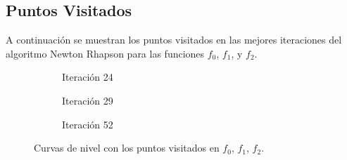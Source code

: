 \newpage
\subsection{Puntos Visitados}

A continuación se muestran los puntos visitados en las mejores iteraciones del algoritmo Newton Rhapson para las funciones $f_0$, $f_1$, y $f_2$. \\

\begin{figure}[h]
     \centering
     \begin{subfigure}[b]{0.45\textwidth}
         \centering
         
         \caption{Iteración 24}
         \label{fig:curvas-newton-f0}
     \end{subfigure}
     \hfill
     \begin{subfigure}[b]{0.45\textwidth}
         \centering
         
         \caption{Iteración 29}
         \label{fig:curvas-newton-f1}
     \end{subfigure}
     \hfill
     \begin{subfigure}[b]{0.45\textwidth}
         \centering
         
         \caption{Iteración 52}
         \label{fig:curvas-newton-f2-52}
     \end{subfigure}
        \caption{Curvas de nivel con los puntos visitados en $f_0$, $f_1$, $f_2$.}
        \label{fig:curvas-newton}
\end{figure}